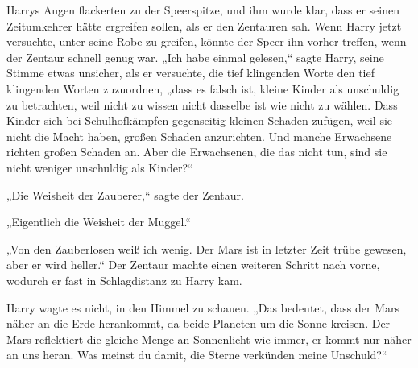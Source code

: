Harrys Augen flackerten zu der Speerspitze, und ihm wurde klar, dass er seinen Zeitumkehrer hätte ergreifen sollen, als er den Zentauren sah. Wenn Harry jetzt versuchte, unter seine Robe zu greifen, könnte der Speer ihn vorher treffen, wenn der Zentaur schnell genug war.
„Ich habe einmal gelesen,“ sagte Harry, seine Stimme etwas unsicher, als er versuchte, die tief klingenden Worte den tief klingenden Worten zuzuordnen,
„dass es falsch ist, kleine Kinder als unschuldig zu betrachten, weil nicht zu wissen nicht dasselbe ist wie nicht zu wählen. Dass Kinder sich bei Schulhofkämpfen gegenseitig kleinen Schaden zufügen, weil sie nicht die Macht haben, großen Schaden anzurichten. Und manche Erwachsene richten großen Schaden an. Aber die Erwachsenen, die das nicht tun, sind sie nicht weniger unschuldig als Kinder?“

„Die Weisheit der Zauberer,“ sagte der Zentaur.

„Eigentlich die Weisheit der Muggel.“

„Von den Zauberlosen weiß ich wenig. Der Mars ist in letzter Zeit trübe gewesen, aber er wird heller.“ Der Zentaur machte einen weiteren Schritt nach vorne, wodurch er fast in Schlagdistanz zu Harry kam.

Harry wagte es nicht, in den Himmel zu schauen.
„Das bedeutet, dass der Mars näher an die Erde herankommt, da beide Planeten um die Sonne kreisen. Der Mars reflektiert die gleiche Menge an Sonnenlicht wie immer, er kommt nur näher an uns heran. Was meinst du damit, die Sterne verkünden meine Unschuld?“

